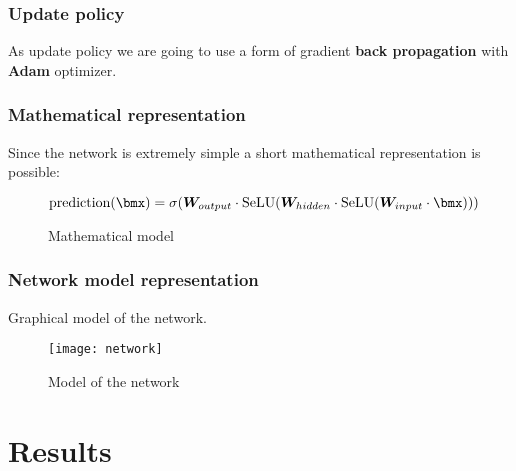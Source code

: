 \section{Update policy}
As update policy we are going to use a form of gradient \textbf{back propagation} with \textbf{Adam} optimizer.

\section{Mathematical representation}
Since the network is extremely simple a short mathematical representation is possible:

\begin{figure}
	\[
		\text{prediction}(\bmx) = \sigma(\matr{W}_{output}\cdot\text{SeLU}(\matr{W}_{hidden}\cdot\text{SeLU}(\matr{W}_{input}\cdot\bmx)))
	\]
	\caption{Mathematical model}
\end{figure}

\section{Network model representation}
Graphical model of the network.
\begin{figure}
	\texttt{[image: network]}
	\caption{Model of the network}
\end{figure}

\part{Results}




